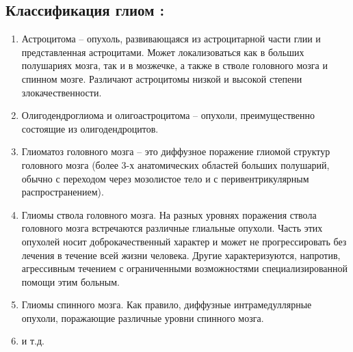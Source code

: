 



\subsection*{Классификация глиом \cite{MedicTherms}:}
\begin{enumerate}
    \item Астроцитома – опухоль, развивающаяся из астроцитарной части глии и
    представленная астроцитами. Может локализоваться как в больших полушариях мозга, так
    и в мозжечке, а также в стволе головного мозга и спинном мозге. Различают астроцитомы
    низкой и высокой степени злокачественности.
    \item Олигодендроглиома и олигоастроцитома – опухоли, преимущественно состоящие
    из олигодендроцитов.
    \item Глиоматоз головного мозга – это диффузное поражение глиомой структур головного
    мозга (более 3-х анатомических областей больших полушарий, обычно с переходом через
    мозолистое тело и с перивентрикулярным распространением). 
    \item Глиомы ствола головного мозга. На разных уровнях поражения ствола головного мозга
    встречаются различные глиальные опухоли. Часть этих опухолей носит доброкачественный характер и может не
    прогрессировать без лечения в течение всей жизни человека. Другие характеризуются, напротив, агрессивным течением с
    ограниченными возможностями специализированной помощи этим больным. 
   \item Глиомы спинного мозга. Как правило, диффузные интрамедуллярные опухоли,
    поражающие различные уровни спинного мозга. 
    \item и т.д.
\end{enumerate} 





